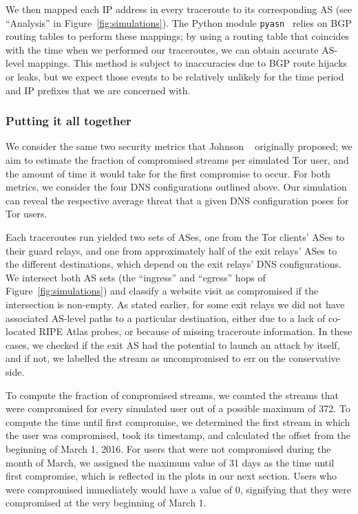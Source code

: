 We then mapped each IP address in every traceroute to its corresponding AS (see
``Analysis'' in Figure~\ref{fig:simulations}).  The
Python module {\tt pyasn}~\cite{pyasn} relies on BGP routing tables to perform
these mappings; by using a routing table that coincides with the time when we
performed our traceroutes, we can obtain accurate AS-level mappings.  This
method is subject to inaccuracies due to BGP route hijacks or leaks, but we
expect those events to be relatively unlikely for the time period and IP
prefixes that we are concerned with.

\subsubsection{Putting it all together}
We consider the same two security metrics that Johnson
\ea~\cite[\S~4.2]{Johnson2013a} originally proposed;
we aim to estimate \first the fraction of compromised streams per simulated Tor
user, and \second the amount of time it would take for the first compromise to
occur.  For both metrics, we consider the four DNS configurations outlined
above.  Our simulation can reveal the respective average threat that a given DNS
configuration poses for Tor users.

Each traceroutes run yielded two sets of ASes, one
from the Tor clients' ASes to their guard relays, and one from approximately half
of the exit relays' ASes to the different destinations, which depend on the exit
relays' DNS configurations.  We intersect both AS sets (the ``ingress'' and
``egress'' hops of Figure~\ref{fig:simulations}) and classify a website visit as
compromised if the intersection is non-empty.  As stated earlier, for some exit
relays we did not have associated AS-level paths to a particular destination,
either due to a lack of co-located RIPE Atlas probes, or because of missing
traceroute information.  In these cases, we checked if the exit AS had the
potential to launch an attack by itself, and if not, we labelled the stream
as uncompromised to err on the conservative side.

To compute the fraction of compromised streams, we counted the streams that were
compromised for every simulated user out of a possible maximum of 372. To
compute the time until first compromise, we determined the first stream in which
the user was compromised, took its timestamp, and calculated the offset from the
beginning of March 1, 2016.  For users that were not compromised during the
month of March, we assigned the maximum value of 31 days as the time until first
compromise, which is reflected in the plots in our next section.  Users who were
compromised immediately would have a value of 0, signifying that they were
compromised at the very beginning of March 1.


